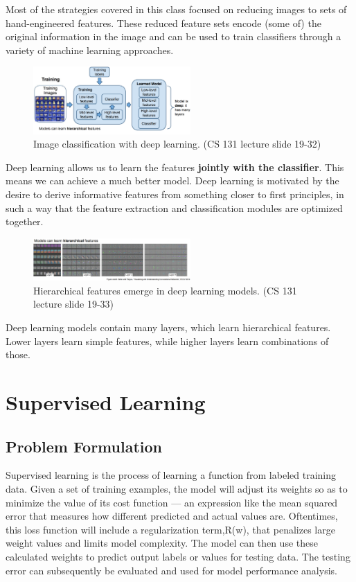 \documentclass{article}
\begin{document}
Most of the strategies covered in this class focused on reducing images to sets of hand-engineered features. These reduced feature sets encode (some of) the original information in the image and can be used to train classifiers through a variety of machine learning approaches. 

\begin{figure}[h]
\includegraphics[width=6cm]{DL_schematic.png}
\centering
\caption{Image classification with deep learning. (CS 131 lecture slide 19-32)}
\end{figure}

Deep learning allows us to learn the features \textbf{jointly with the classifier}. This means we can achieve a much better model. Deep learning is motivated by the desire to derive informative features from something closer to first principles, in such a way that the feature extraction and classification modules are optimized together.

\begin{figure}[h]
\includegraphics[width=6cm]{Hierarchical_features.png}
\centering
\caption{Hierarchical features emerge in deep learning models. (CS 131 lecture slide 19-33)}
\end{figure}

Deep learning models contain many layers, which learn hierarchical features. Lower layers learn simple features, while higher layers learn combinations of those.
\section{Supervised Learning}

\subsection{Problem Formulation}
Supervised learning is the process of learning a function from labeled training data. Given a set of training examples, the model will adjust its weights so as to minimize the value of its cost function — an expression like the mean squared error that measures how different predicted and actual values are. Oftentimes, this loss function will include a regularization term,R(w), that penalizes large weight values and limits model complexity. The model can then use these calculated weights to predict output labels or values for testing data. The testing error can subsequently be evaluated and used for model performance analysis. 
\end{document}
